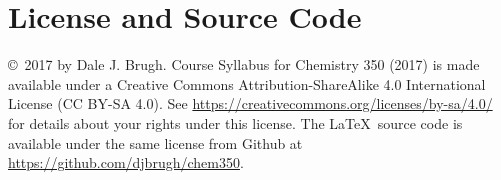 \documentclass[letterpaper,oneside,onecolumn,11pt,article]{memoir}
\begin{document}
\section{License and Source Code}
\copyright\ 2017 by Dale J. Brugh. Course Syllabus for Chemistry 350 (2017) is made available under a Creative Commons Attribution-ShareAlike 4.0 International License (CC BY-SA 4.0). See \href{https://creativecommons.org/licenses/by-sa/4.0/}{https://creativecommons.org/licenses/by-sa/4.0/} for details about your rights under this license. The \LaTeX\ source code is available under the same license from Github at \href{https://github.com/djbrugh/chem350}{https://github.com/djbrugh/chem350}. 
%
%
\end{document}
